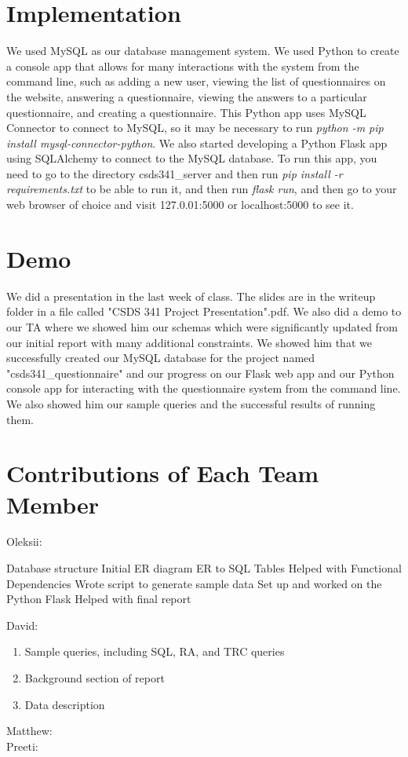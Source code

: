 \documentclass[12pt, oneside, a4paper]{article}
\begin{document}
    \section{Implementation}
    We used MySQL as our database management system. We used Python to create a console app that allows for many interactions with the system from the command line, such as adding a new user, viewing the list of questionnaires on the website, answering a questionnaire, viewing the answers to a particular questionnaire, and creating a questionnaire. This Python app uses MySQL Connector to connect to MySQL, so it may be necessary to run \emph{python -m pip install mysql-connector-python}. We also started developing a Python Flask app using SQLAlchemy to connect to the MySQL database. To run this app, you need to go to the directory csds341\_server and then run \emph{pip install -r requirements.txt} to be able to run it, and then run \emph{flask run}, and then go to your web browser of choice and visit 127.0.01:5000 or localhost:5000 to see it.
    \section{Demo}
    We did a presentation in the last week of class. The slides are in the writeup folder in a file called "CSDS 341 Project Presentation".pdf. We also did a demo to our TA where we showed him our schemas which were significantly updated from our initial report with many additional constraints. We showed him that we successfully created our MySQL database for the project named "csds341\_questionnaire" and our progress on our Flask web app and our Python console app for interacting with the questionnaire system from the command line. We also showed him our sample queries and the successful results of running them.
    \section{Contributions of Each Team Member}
    Oleksii:
    \begin{outline}
        \1 Database structure
        \1 Initial ER diagram
        \1 ER to SQL Tables
        \1 Helped with Functional Dependencies
        \1 Wrote script to generate sample data
        \1 Set up and worked on the Python Flask
        \1 Helped with final report
    \end{outline}
    David:
    \begin{enumerate}
        \item Sample queries, including SQL, RA, and TRC queries
        \item Background section of report
        \item Data description
    \end{enumerate}
    Matthew:
    \\
    Preeti:
\end{document}
